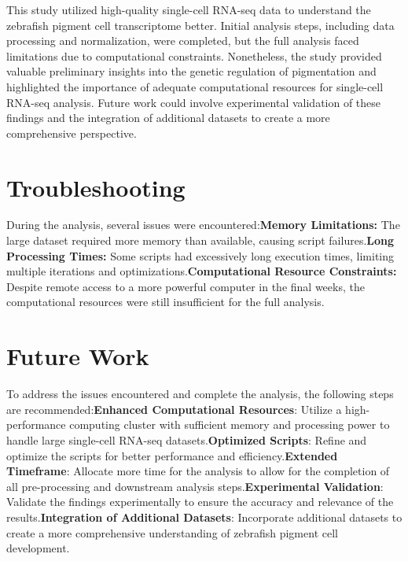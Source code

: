 \documentclass[runningheads]{llncs}
\begin{document}
This study utilized high-quality single-cell RNA-seq data to understand the zebrafish pigment cell transcriptome better. Initial analysis steps, including data processing and normalization, were completed, but the full analysis faced limitations due to computational constraints. Nonetheless, the study provided valuable preliminary insights into the genetic regulation of pigmentation and highlighted the importance of adequate computational resources for single-cell RNA-seq analysis. Future work could involve experimental validation of these findings and the integration of additional datasets to create a more comprehensive perspective.

\section{Troubleshooting}

During the analysis, several issues were encountered:\newline\textbf{Memory Limitations:} The large dataset required more memory than available, causing script failures.\newline\textbf{Long Processing Times:} Some scripts had excessively long execution times, limiting multiple iterations and optimizations.\newline\textbf{Computational Resource Constraints:} Despite remote access to a more powerful computer in the final weeks, the computational resources were still insufficient for the full analysis.

\section{Future Work}
To address the issues encountered and complete the analysis, the following steps are recommended:\newline\textbf{Enhanced Computational Resources}: Utilize a high-performance computing cluster with sufficient memory and processing power to handle large single-cell RNA-seq datasets.\newline\textbf{Optimized Scripts}: Refine and optimize the scripts for better performance and efficiency.\newline\textbf{Extended Timeframe}: Allocate more time for the analysis to allow for the completion of all pre-processing and downstream analysis steps.\newline\textbf{Experimental Validation}: Validate the findings experimentally to ensure the accuracy and relevance of the results.\newline\textbf{Integration of Additional Datasets}: Incorporate additional datasets to create a more comprehensive understanding of zebrafish pigment cell development.
\end{document}
